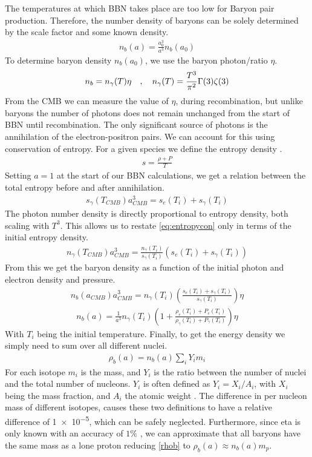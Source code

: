 The temperatures at which BBN takes place are too low for Baryon pair production. Therefore, the number density of baryons can be solely determined by the scale factor and some known density. 
\begin{align}
    n_b(a)=\frac{a_0^3}{a^3}n_{b}(a_0)
\end{align}
To determine baryon density $n_{b}(a_0)$, we use the baryon photon/ratio $\eta$. 
\begin{align}
    n_b=n_\gamma(T) \eta \quad , \quad n_\gamma(T)=\frac{T^3}{\pi^2}\Gamma(3)\zeta(3)
\end{align}
From the CMB we can measure the value of $\eta$, during recombination, but unlike baryons the number of photons does not remain unchanged from the start of BBN until recombination. The only significant source of photons is the annihilation of the electron-positron pairs. We can account for this using conservation of entropy. For a given species we define the entropy density \cite[(3.91)]{kolbturner}.
\begin{align}
    s=\frac{\rho+P}{T}
\end{align}
Setting $a=1$ at the start of our BBN calculations, we get a relation between the total entropy before and after annihilation.
\begin{align}
     s_{\gamma}(T_{CMB})a_{CMB}^3= s_e(T_{i})+s_{\gamma}(T_{i})
    \label{eq:entropycon}
\end{align}
The photon number density is directly proportional to entropy density, both scaling with $T^3$. This allows us to restate \ref{eq:entropycon} only in terms of the initial entropy density.
\begin{align}
    n_{\gamma}(T_{CMB})a_{CMB}^3 = \frac{n_\gamma(T_{i})}{s_{\gamma}(T_{i})}\left(s_e(T_{i})+s_{\gamma}(T_{i})\right)
\end{align}
From this we get the baryon density as a function of the initial photon and electron density and pressure.
\begin{align}
    n_b(a_{CMB}){a_{CMB}^3}=n_\gamma(T_{i}) \left(\frac{s_e(T_{i})+s_{\gamma}(T_{i})}{s_{\gamma}(T_{i})}\right)\eta
\end{align}
\begin{align}
    n_b(a)=\frac{1}{a^3}n_\gamma(T_{i}) \left(1+\frac{\rho_e(T_{i})+P_{e}(T_{i})}{\rho_{\gamma}(T_{i})+P_{\gamma}(T_{i})}\right)\eta
\end{align}
With $T_i$ being the initial temperature. Finally, to get the energy density we simply need to sum over all different nuclei. 
\begin{align}
    \rho_b(a)=n_b(a)\sum_{i}^{}Y_i m_i
    \label{rhob}
\end{align}
For each isotope $m_i$ is the mass, and $Y_i$ is the ratio between the number of nuclei and the total number of nucleons. $Y_i$ is often defined as $Y_i=X_i/A_i$, with $X_i$ being the mass fraction, and $A_i$ the atomic weight \cite{Wagoner69}. The difference in per nucleon mass of different isotopes, causes these two definitions to have a relative difference of \num{1e-5}, which can be safely neglected. Furthermore, since eta is only known with an accuracy of $1\%$ \cite{Planck}, we can approximate that all baryons have the same mass as a lone proton reducing \ref{rhob} to $\rho_b(a) \approx n_b(a)m_p$.

